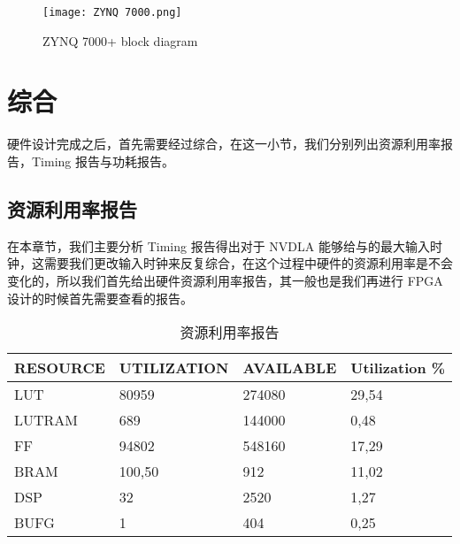 \begin{figure}[!htbp]
    \centering
    \texttt{[image: ZYNQ 7000.png]}
    \caption{ZYNQ 7000+ block diagram}
    \label{fig:ZYNQ 7000+}
\end{figure}

\section{综合}

硬件设计完成之后，首先需要经过综合，在这一小节，我们分别列出资源利用率报告，Timing 报告与功耗报告。

\subsection{资源利用率报告}

在本章节，我们主要分析 Timing 报告得出对于 NVDLA 能够给与的最大输入时钟，这需要我们更改输入时钟来反复综合，在这个过程中硬件的资源利用率是不会变化的，所以我们首先给出硬件资源利用率报告，其一般也是我们再进行 FPGA 设计的时候首先需要查看的报告。

\begin{table}[!htbp]
    \caption{资源利用率报告}
    \label{tab:Resource Report}
    \centering
    \footnotesize%
    \setlength{\tabcolsep}{4pt}%
    \renewcommand{\arraystretch}{1.2}%
    \begin{tabular}{llll}
        \toprule
        \textbf{RESOURCE} & \textbf{UTILIZATION} & \textbf{AVAILABLE} & \textbf{Utilization \%} \\
        \midrule
        LUT               & 80959                & 274080             & 29,54                   \\
        LUTRAM            & 689                  & 144000             & 0,48                    \\
        FF                & 94802                & 548160             & 17,29                   \\
        BRAM              & 100,50               & 912                & 11,02                   \\
        DSP               & 32                   & 2520               & 1,27                    \\
        BUFG              & 1                    & 404                & 0,25                    \\
        \bottomrule                   
    \end{tabular}
\end{table}

